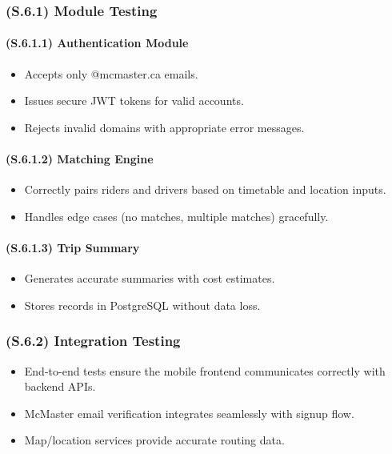 \documentclass[12pt,letterpaper]{article}
\begin{document}
\subsubsection{(S.6.1) Module Testing} %

\paragraph{(S.6.1.1) Authentication Module} %
\begin{itemize}
    \item Accepts only @mcmaster.ca emails.
    \item Issues secure JWT tokens for valid accounts.
    \item Rejects invalid domains with appropriate error messages.
\end{itemize}

\paragraph{(S.6.1.2) Matching Engine} %
\begin{itemize}
    \item Correctly pairs riders and drivers based on timetable and location inputs.
    \item Handles edge cases (no matches, multiple matches) gracefully.
\end{itemize}

\paragraph{(S.6.1.3) Trip Summary} %
\begin{itemize}
    \item Generates accurate summaries with cost estimates.
    \item Stores records in PostgreSQL without data loss.
\end{itemize}

\subsubsection{(S.6.2) Integration Testing} %
\begin{itemize}
    \item End-to-end tests ensure the mobile frontend communicates correctly with backend APIs.
    \item McMaster email verification integrates seamlessly with signup flow.
    \item Map/location services provide accurate routing data.
\end{itemize}
\end{document}
